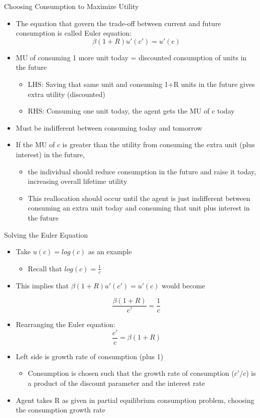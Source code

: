 \documentclass[aspectratio=1610]{beamer}
\begin{document}
\begin{frame}[wide]{Choosing Consumption to Maximize Utility}
	\begin{itemize}
		\item The equation that govern the trade-off between current and future consumption is called Euler equation:
		\[\beta (1+R) u'(c')= u'(c)\]
		\item 	MU of consuming 1 more unit today = discounted consumption of  units in the future
		\begin{itemize}
			\item LHS: Saving that same unit and consuming 1+R units in the future gives extra utility (discounted)
			\item RHS: Consuming one unit today, the agent gets the MU of c today
			
		\end{itemize}
		\item Must be indifferent between consuming today and tomorrow
		\item If the MU of $c$ is greater than the utility from consuming the extra unit (plus interest) in the future,
		\begin{itemize}
			\item the individual should reduce consumption in the future and raise it today, increasing overall lifetime utility
			\item This reallocation should occur until the agent is just indifferent between consuming an extra unit today and consuming that unit plus interest in the future
		\end{itemize}
	\end{itemize}
\end{frame}

\begin{frame}[wide]{Solving the Euler Equation}
	\begin{itemize}
		\item Take $u(c) = log (c)$ as an example
		\begin{itemize}
			\item Recall that $log (c) = \frac{1}{c}$
		\end{itemize}
		\item This implies that $\beta (1+R) u'(c')= u'(c)$ would become
		
		\[\frac{\beta (1+R)}{c'} = \frac{1}{c}\]
		\item Rearranging the Euler equation:
		\[\frac{c'}{c} = \beta (1+R)\]
		\item Left side is growth rate of consumption (plus 1)
		\begin{itemize}
			\item Consumption is chosen such that the growth rate of consumption ($c'/c$) is a product of the discount parameter and the interest rate
		\end{itemize}
		\item Agent takes R as given in partial equilibrium consumption problem, choosing the consumption growth rate
	\end{itemize}
\end{frame}
\end{document}
